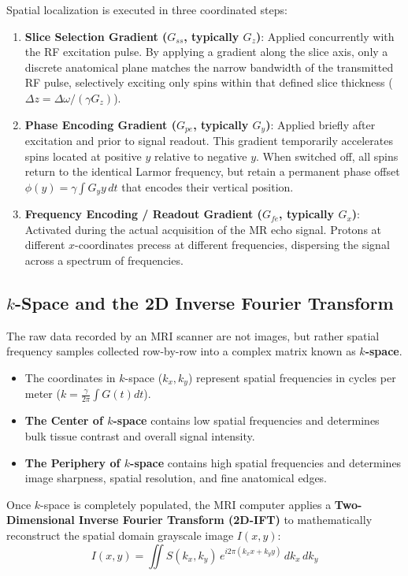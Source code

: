 \documentclass[11pt,a4paper]{article}
\begin{document}
Spatial localization is executed in three coordinated steps:
\begin{enumerate}[leftmargin=*]
    \item \textbf{Slice Selection Gradient ($G_{ss}$, typically $G_z$)}: Applied concurrently with the RF excitation pulse. By applying a gradient along the slice axis, only a discrete anatomical plane matches the narrow bandwidth of the transmitted RF pulse, selectively exciting only spins within that defined slice thickness ($\Delta z = \Delta\omega / (\gamma G_z)$).
    \item \textbf{Phase Encoding Gradient ($G_{pe}$, typically $G_y$)}: Applied briefly after excitation and prior to signal readout. This gradient temporarily accelerates spins located at positive $y$ relative to negative $y$. When switched off, all spins return to the identical Larmor frequency, but retain a permanent phase offset $\phi(y) = \gamma \int G_y y \, dt$ that encodes their vertical position.
    \item \textbf{Frequency Encoding / Readout Gradient ($G_{fe}$, typically $G_x$)}: Activated during the actual acquisition of the MR echo signal. Protons at different $x$-coordinates precess at different frequencies, dispersing the signal across a spectrum of frequencies.
\end{enumerate}

\subsection{$k$-Space and the 2D Inverse Fourier Transform}
The raw data recorded by an MRI scanner are not images, but rather spatial frequency samples collected row-by-row into a complex matrix known as \textbf{$k$-space}. 
\begin{itemize}
    \item The coordinates in $k$-space ($k_x, k_y$) represent spatial frequencies in cycles per meter ($k = \frac{\gamma}{2\pi} \int G(t) dt$).
    \item \textbf{The Center of $k$-space} contains low spatial frequencies and determines bulk tissue contrast and overall signal intensity.
    \item \textbf{The Periphery of $k$-space} contains high spatial frequencies and determines image sharpness, spatial resolution, and fine anatomical edges.
\end{itemize}

Once $k$-space is completely populated, the MRI computer applies a \textbf{Two-Dimensional Inverse Fourier Transform (2D-IFT)} to mathematically reconstruct the spatial domain grayscale image $I(x,y)$:
\begin{equation}
    I(x,y) = \iint S(k_x, k_y) \, e^{i 2\pi (k_x x + k_y y)} \, dk_x \, dk_y
\end{equation}
\end{document}
